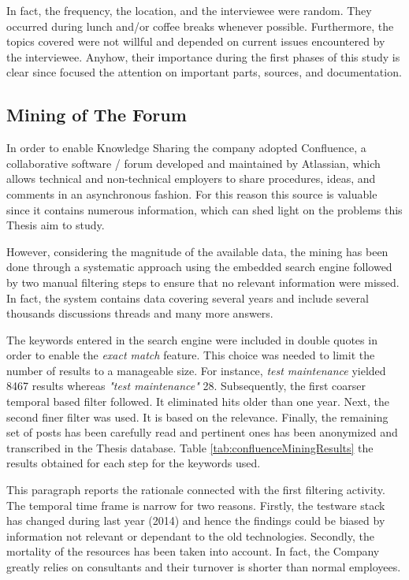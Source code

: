 In fact, the frequency, the location, and the interviewee were random. They occurred during lunch and/or coffee breaks whenever possible. Furthermore, the topics covered were not willful and depended on current issues encountered by the interviewee. Anyhow, their importance during the first phases of this study is clear since focused the attention on important parts, sources, and documentation.

\subsection{Mining of The Forum} \label{mining_forum}
In order to enable Knowledge Sharing the company adopted Confluence, a collaborative software / forum developed and maintained by Atlassian, which allows technical and non-technical employers to share procedures, ideas, and comments in an asynchronous fashion. For this reason this source is valuable since it contains numerous information, which can shed light on the problems this Thesis aim to study.

However, considering the magnitude of the available data, the mining has been done through a systematic approach using the embedded search engine followed by two manual filtering steps to ensure that no relevant information were missed. In fact, the system contains data covering several years and include several thousands discussions threads and many more answers. 

The keywords entered in the search engine were included in double quotes in order to enable the \textit{exact match} feature. This choice was needed to limit the number of results to a manageable size. For instance, \textit{test maintenance} yielded 8467 results whereas \textit{"test maintenance"} 28. Subsequently, the first coarser temporal based filter followed. It eliminated hits older than one year. Next, the second finer filter was used. It is based on the relevance. Finally, the remaining set of posts has been carefully read and pertinent ones has been anonymized and transcribed in the Thesis database. Table \ref{tab:confluenceMiningResults} the results obtained for each step for the keywords used.

This paragraph reports the rationale connected with the first filtering activity. The temporal time frame is narrow for two reasons. Firstly, the testware stack has changed during last year (2014) and hence the findings could be biased by information not relevant or dependant to the old technologies. Secondly, the mortality of the resources has been taken into account. In fact, the Company greatly relies on consultants and their turnover is shorter than normal employees. 


